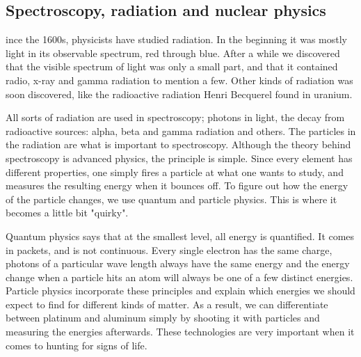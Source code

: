 \subsection*{Spectroscopy, radiation and nuclear physics}
ince the 1600s, physicists have studied radiation.
In the beginning it was mostly light in its observable spectrum, red through blue.
After a while we discovered that the visible spectrum of light was only a small part, and that it contained radio, x-ray and gamma radiation to mention a few.
Other kinds of radiation was soon discovered, like the radioactive radiation Henri Becquerel \cite{First_radioactivity} found in uranium.

All sorts of radiation are used in spectroscopy; photons in light, the decay from radioactive sources: alpha, beta and gamma radiation and others.
The particles in the radiation are what is important to spectroscopy.
Although the theory behind spectroscopy is advanced physics, the principle is simple.
Since every element has different properties, one simply fires a particle at what one wants to study, and measures the resulting energy when it bounces off.
To figure out how the energy of the particle changes, we use quantum and particle physics.
This is where it becomes a little bit "quirky".

Quantum physics says that at the smallest level, all energy is quantified.
It comes in packets, and is not continuous.
Every single electron has the same charge, photons of a particular wave length always have the same energy and the energy change when a particle hits an atom will always be one of a few distinct energies.
Particle physics incorporate these principles and explain which energies we should expect to find for different kinds of matter.
As a result, we can differentiate between platinum and aluminum simply by shooting it with particles and measuring the energies afterwards.
These technologies are very important when it comes to hunting for signs of life.